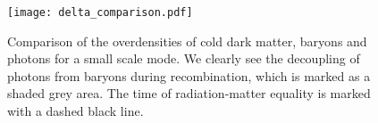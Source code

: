     \begin{figure}
        \texttt{[image: delta\_comparison.pdf]}
        \caption{Comparison of the overdensities of cold dark matter, baryons and photons for a small scale mode. We clearly see the decoupling of photons from baryons during recombination, which is marked as a shaded grey area. The time of radiation-matter equality is marked with a dashed black line. }
        \label{fig:m3:delta_comparison}
    \end{figure}
    
    

